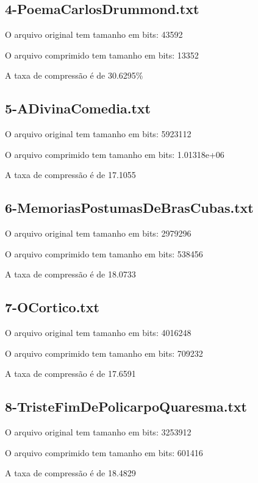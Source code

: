 \documentclass[12pt]{article}
\begin{document}
\subsection{4-PoemaCarlosDrummond.txt}
\space \par O arquivo original tem tamanho em bits: 43592
\space \par O arquivo comprimido tem tamanho em bits: 13352
\space \par A taxa de compressão é de 30.6295\%

\subsection{	5-ADivinaComedia.txt}
\space \par O arquivo original tem tamanho em bits: 5923112
\space \par O arquivo comprimido tem tamanho em bits: 1.01318e+06
\space \par A taxa de compressão é de 17.1055%

\subsection{	6-MemoriasPostumasDeBrasCubas.txt            }                                 
\space \par O arquivo original tem tamanho em bits: 2979296
\space \par O arquivo comprimido tem tamanho em bits: 538456
\space \par A taxa de compressão é de 18.0733%

\subsection{	7-OCortico.txt                  }        
\space \par O arquivo original tem tamanho em bits: 4016248
\space \par O arquivo comprimido tem tamanho em bits: 709232
\space \par A taxa de compressão é de 17.6591%

\subsection{	8-TristeFimDePolicarpoQuaresma.txt}                                              
\space \par O arquivo original tem tamanho em bits: 3253912
\space \par O arquivo comprimido tem tamanho em bits: 601416
\space \par A taxa de compressão é de 18.4829%
\end{document}
